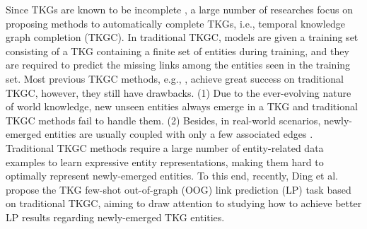 \documentclass[runningheads]{llncs}
\begin{document}
Since TKGs are known to be incomplete \cite{DBLP:conf/www/LeblayC18}, a large number of researches focus on proposing methods to automatically complete TKGs, i.e., temporal knowledge graph completion (TKGC). In traditional TKGC, models are given a training set consisting of a TKG containing a finite set of entities during training, and they are required to predict the missing links among the entities seen in the training set. Most previous TKGC methods, e.g., \cite{tresp2015learning,DBLP:conf/www/LeblayC18,DBLP:conf/kdd/JungJK21,ding2022simple}, achieve great success on traditional TKGC, however, they still have drawbacks. (1) Due to the ever-evolving nature of world knowledge, new unseen entities always emerge in a TKG and traditional TKGC methods fail to handle them. (2) Besides, in real-world scenarios, newly-emerged entities are usually coupled with only a few associated edges \cite{ding2022few}. Traditional TKGC methods require a large number of entity-related data examples to learn expressive entity representations, making them hard to optimally represent newly-emerged entities. To this end, recently, Ding et al. \cite{ding2022few} propose the TKG few-shot out-of-graph (OOG) link prediction (LP) task based on traditional TKGC, aiming to draw attention to studying how to achieve better LP results regarding newly-emerged TKG entities. 

\end{document}
